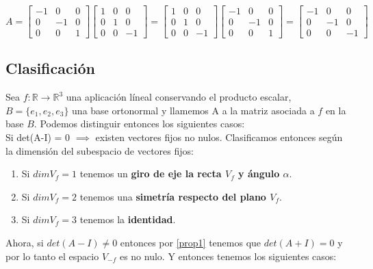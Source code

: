 \documentclass[10pt,a4paper]{article}
\theoremstyle{mystyle}
\begin{document}
\[
A=
\begin{bmatrix}
-1 & 0 & 0 \\
0 & -1 & 0 \\
0 & 0 & 1
\end{bmatrix}
\begin{bmatrix}
1 & 0 & 0 \\
0 & 1 & 0 \\
0 & 0 & -1
\end{bmatrix} =
\begin{bmatrix}
1 & 0 & 0 \\
0 & 1 & 0 \\
0 & 0 & -1
\end{bmatrix}
\begin{bmatrix}
-1 & 0 & 0 \\
0 & -1 & 0 \\
0 & 0 & 1
\end{bmatrix} =
\begin{bmatrix}
-1 & 0 & 0 \\
0 & -1 & 0 \\
0 & 0 & -1
\end{bmatrix}
\]

\subsection{Clasificación}

Sea $f:\mathbb{R} \to \mathbb{R}^3$ una aplicación líneal conservando el producto escalar, $B=\lbrace e_1,e_2,e_3 \rbrace$ una base ortonormal y llamemos A a la matriz asociada a $f$ en la base $B$. Podemos distinguir entonces los siguientes casos:\\

Si det(A-I) = 0 $\implies$ existen vectores fijos no nulos. Clasificamos entonces según la dimensión del subespacio de vectores fijos:\\

\begin{enumerate}
\item Si $dimV_f = 1$ tenemos un \textbf{giro de eje la recta $V_f$ y ángulo $\alpha$}.
\item Si $dimV_f = 2$ tenemos una \textbf{simetría respecto del plano $V_f$}.
\item Si $dimV_f = 3$ tenemos la \textbf{identidad}.
\end{enumerate}

Ahora, si $det(A-I) \neq 0$ entonces por \ref{prop1} tenemos que $det(A+I) = 0$ y por lo tanto el espacio $V_{-f}$ es no nulo. Y entonces tenemos los siguientes casos:
\end{document}
